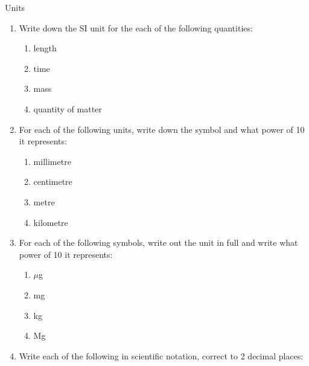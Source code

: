 \begin{eocexercises}{Units}
            \nopagebreak
      \label{m30853*id68082}\begin{enumerate}[noitemsep, label=\textbf{\arabic*}. ] 
            \label{m30853*uid63}\item Write down the SI unit for the each of the following quantities:
\label{m30853*id68098}\begin{enumerate}[noitemsep, label=\textbf{\alph*}. ] 
            \label{m30853*uid64}\item length
\label{m30853*uid65}\item time
\label{m30853*uid66}\item mass
\label{m30853*uid67}\item quantity of matter
\end{enumerate}
                \label{m30853*uid68}\item For each of the following units, write down the symbol and what power of 10 it represents:
\label{m30853*id68163}\begin{enumerate}[noitemsep, label=\textbf{\alph*}. ] 
            \label{m30853*uid69}\item millimetre
\label{m30853*uid70}\item centimetre
\label{m30853*uid71}\item metre
\label{m30853*uid72}\item kilometre
\end{enumerate}
                \label{m30853*uid73}\item For each of the following symbols, write out the unit in full and write what power of 10 it represents:
\label{m30853*id68229}\begin{enumerate}[noitemsep, label=\textbf{\alph*}. ] 
            \label{m30853*uid74}\item $\mu $g
\label{m30853*uid75}\item mg
\label{m30853*uid76}\item kg
\label{m30853*uid77}\item Mg
\end{enumerate}
                \label{m30853*uid78}\item Write each of the following in scientific notation, correct to 2 decimal places:

\end{enumerate}
\end{eocexercises}
